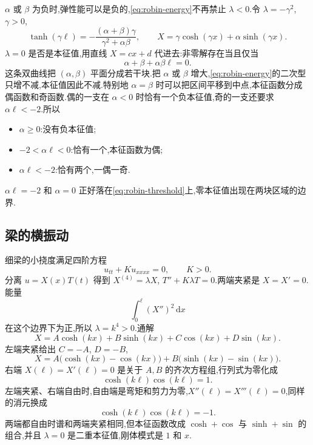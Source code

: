 $\alpha$ 或 $\beta$ 为负时,弹性能可以是负的,\eqref{eq:robin-energy}不再禁止 $\lambda<0$.令 $\lambda=-\gamma^2$,$\gamma>0$,
\begin{equation}
  \tanh(\gamma\ell)=-\frac{(\alpha+\beta)\gamma}{\gamma^2+\alpha\beta},
  \qquad
  X=\gamma\cosh(\gamma x)+\alpha\sinh(\gamma x).
\end{equation}
$\lambda=0$ 是否是本征值,用直线 $X=cx+d$ 代进去:非零解存在当且仅当
\begin{equation}
  \alpha+\beta+\alpha\beta\ell=0.
  \label{eq:robin-threshold}
\end{equation}
这条双曲线把 $(\alpha,\beta)$ 平面分成若干块.把 $\alpha$ 或 $\beta$ 增大,\eqref{eq:robin-energy}的二次型只增不减,本征值因此不减.特别地 $\alpha=\beta$ 时可以把区间平移到中点,本征函数分成偶函数和奇函数.偶的一支在 $\alpha<0$ 时恰有一个负本征值,奇的一支还要求 $\alpha\ell<-2$.所以
\begin{itemize}
  \item $\alpha\geq 0$:没有负本征值;
  \item $-2<\alpha\ell<0$:恰有一个,本征函数为偶;
  \item $\alpha\ell<-2$:恰有两个,一偶一奇.
\end{itemize}
$\alpha\ell=-2$ 和 $\alpha=0$ 正好落在\eqref{eq:robin-threshold}上,零本征值出现在两块区域的边界.

\subsection{梁的横振动}
细梁的小挠度满足四阶方程
\begin{equation}
  u_{tt}+K u_{xxxx}=0, \qquad K>0.
\end{equation}
分离 $u=X(x)T(t)$ 得到 $X^{(4)}=\lambda X$, $T''+K\lambda T=0$.两端夹紧是 $X=X'=0$.能量
\begin{equation}
  \int_0^{\ell}(X'')^2\,\mathrm{d}x
\end{equation}
在这个边界下为正,所以 $\lambda=k^4>0$.通解
\begin{equation}
  X=A\cosh(kx)+B\sinh(kx)+C\cos(kx)+D\sin(kx).
\end{equation}
左端夹紧给出 $C=-A$, $D=-B$,
\begin{equation}
  X=A\bigl(\cosh(kx)-\cos(kx)\bigr)+B\bigl(\sinh(kx)-\sin(kx)\bigr).
\end{equation}
右端 $X(\ell)=X'(\ell)=0$ 是关于 $A,B$ 的齐次方程组,行列式为零化成
\begin{equation}
  \cosh(k\ell)\cos(k\ell)=1.
  \label{eq:beam-clamped}
\end{equation}
左端夹紧、右端自由时,自由端是弯矩和剪力为零,$X''(\ell)=X'''(\ell)=0$,同样的消元换成
\begin{equation}
  \cosh(k\ell)\cos(k\ell)=-1.
\end{equation}
两端都自由时谱和两端夹紧相同,但本征函数改成 $\cosh+\cos$ 与 $\sinh+\sin$ 的组合,并且 $\lambda=0$ 是二重本征值,刚体模式是 $1$ 和 $x$.

